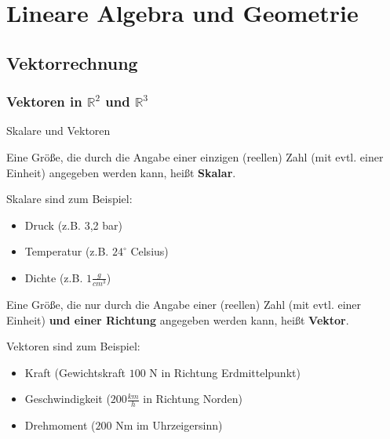 \section{Lineare Algebra und Geometrie}
\subsection{Vektorrechnung}
\subsubsection{Vektoren in $\mathbb{R}^2 $ und $\mathbb{R}^3 $}

\begin{frame}{Skalare und Vektoren}
	\begin{definition}[Skalar]
		Eine Größe, die durch die Angabe einer einzigen (reellen) Zahl (mit evtl. einer Einheit) angegeben werden kann, heißt \textbf{Skalar}.
	\end{definition}
	Skalare sind zum Beispiel:
	\begin{itemize}
		\item Druck (z.B. 3,2 bar)
		\item Temperatur (z.B. $24^\circ$ Celsius)
		\item Dichte (z.B. $1 \frac{g}{cm^3}$)
	\end{itemize}
	\begin{definition}[Vektor]
		Eine Größe, die nur durch die Angabe einer (reellen) Zahl (mit evtl. einer Einheit) \textbf{und einer Richtung} angegeben werden kann, heißt \textbf{Vektor}.
	\end{definition}
	Vektoren sind zum Beispiel:
	\begin{itemize}
		\item Kraft (Gewichtskraft $100$ N in Richtung Erdmittelpunkt)
		\item Geschwindigkeit ($200 \frac{km}{h}$ in Richtung Norden)
		\item Drehmoment ($200$ Nm im Uhrzeigersinn)
	\end{itemize}	
\end{frame}

